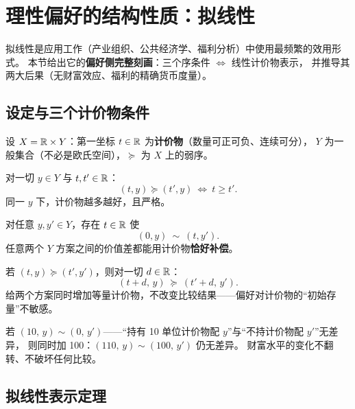 \section{理性偏好的结构性质：拟线性}\label{sec:quasilinear}

拟线性是应用工作（产业组织、公共经济学、福利分析）中使用最频繁的效用形式。
本节给出它的\textbf{偏好侧完整刻画}：三个序条件 $\iff$ 线性计价物表示，
并推导其两大后果（无财富效应、福利的精确货币度量）。

\subsection{设定与三个计价物条件}

设 $X=\mathbb{R}\times Y$：第一坐标 $t\in\mathbb{R}$ 为\textbf{计价物}（数量可正可负、连续可分），
$Y$ 为一般集合（不必是欧氏空间），$\succeq$ 为 $X$ 上的弱序。

\begin{condition}[计价物有价值]\label{cond:num-valuable}
对一切 $y\in Y$ 与 $t,t'\in\mathbb{R}$：
\[
(t,y)\succeq(t',y)\ \Longleftrightarrow\ t\ge t'.
\]
同一 $y$ 下，计价物越多越好，且严格。
\end{condition}

\begin{condition}[补偿可行]\label{cond:compensable}
对任意 $y,y'\in Y$，存在 $t\in\mathbb{R}$ 使
\[
(0,y)\ \sim\ (t,y').
\]
任意两个 $Y$ 方案之间的价值差都能用计价物\textbf{恰好补偿}。
\end{condition}

\begin{condition}[无财富效应]\label{cond:no-wealth}
若 $(t,y)\succeq(t',y')$，则对一切 $d\in\mathbb{R}$：
\[
(t+d,\,y)\ \succeq\ (t'+d,\,y').
\]
给两个方案同时增加等量计价物，不改变比较结果——偏好对计价物的“初始存量”不敏感。
\end{condition}

\begin{example}[无财富效应的直觉]
若 $(10,\,y)\sim(0,\,y')$——“持有 10 单位计价物配 $y$”与“不持计价物配 $y'$”无差异，
则同时加 100：$(110,\,y)\sim(100,\,y')$ 仍无差异。
财富水平的变化不翻转、不破坏任何比较。
\end{example}

\subsection{拟线性表示定理}

